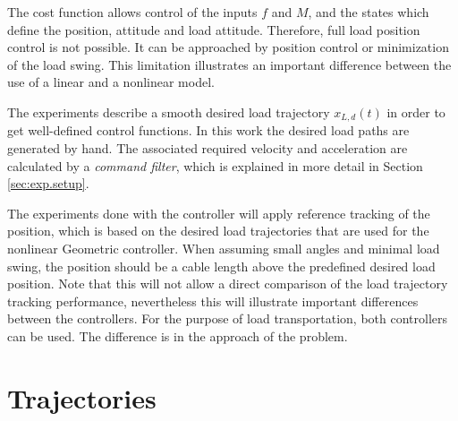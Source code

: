 The  cost function allows control of the inputs $ f $ and $ M $, and the states which define the  position,  attitude and load attitude. 
Therefore, full load position control is not possible. It can be approached by  position control or minimization of the load swing. This limitation illustrates an important difference between the use of a linear and a nonlinear model. 

The experiments describe a smooth desired load trajectory $ x_{L,d}(t) $ in order to get well-defined control functions.
In this work the desired load paths are generated by hand. The associated required velocity and acceleration are calculated by a \textit{command filter}, which is explained in more detail in Section \ref{sec:exp.setup}.

The experiments done with the  controller will apply reference tracking of the  position, which is based on the desired load trajectories that are used for the nonlinear Geometric controller. 
When assuming small angles and minimal load swing, the  position should be a cable length above the predefined desired load position. 
Note that this will not allow a direct comparison of the load trajectory tracking performance, nevertheless this will illustrate important differences between the controllers. 
For the purpose of load transportation, both controllers can be used. The difference is in the approach of the problem.



\newcommand{\caseA}{63}
\newcommand{\caseB}{61}
\newcommand{\caseC}{64}
\newpage
\section{Trajectories}\label{sec:exp.traj}

